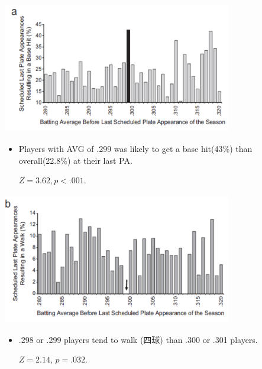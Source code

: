 \documentclass[dvipdfmx,12pt]{beamer}
\begin{document}
\begin{frame}

\begin{center}

\includegraphics[width=10cm,height=5.75cm]{Pope_Simonsohn_F2A.pdf}

\end{center}

 \begin{itemize}
 
 \item Players with AVG of .299 was likely to get a base hit(43\%) than overall(22.8\%) at their last PA.
 
 $Z=3.62 , p <.001$.
 
 \end{itemize}

\end{frame}

\begin{frame}

\begin{center}

\includegraphics[width=10cm,height=5.75cm]{Pope_Simonsohn_F2B.pdf}

\end{center}

 \begin{itemize}
 
 \item .298 or .299 players tend to walk (四球) than .300 or .301 players.
 
 $Z=2.14$, $p=.032$.
 
 \end{itemize}

\end{frame}
\end{document}
